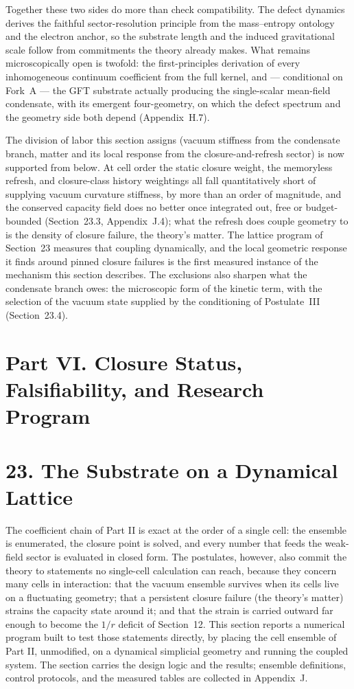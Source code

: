 \documentclass[11pt]{article}
\begin{document}
Together these two sides do more than check compatibility. The defect dynamics derives the faithful sector-resolution principle from the mass--entropy ontology and the electron anchor, so the substrate length and the induced gravitational scale follow from commitments the theory already makes. What remains microscopically open is twofold: the first-principles derivation of every inhomogeneous continuum coefficient from the full kernel, and --- conditional on Fork~A --- the GFT substrate actually producing the single-scalar mean-field condensate, with its emergent four-geometry, on which the defect spectrum and the geometry side both depend (Appendix~H.7).

The division of labor this section assigns (vacuum stiffness from the condensate branch, matter and its local response from the closure-and-refresh sector) is now supported from below. At cell order the static closure weight, the memoryless refresh, and closure-class history weightings all fall quantitatively short of supplying vacuum curvature stiffness, by more than an order of magnitude, and the conserved capacity field does no better once integrated out, free or budget-bounded (Section~23.3, Appendix~J.4); what the refresh does couple geometry to is the density of closure failure, the theory's matter. The lattice program of Section~23 measures that coupling dynamically, and the local geometric response it finds around pinned closure failures is the first measured instance of the mechanism this section describes. The exclusions also sharpen what the condensate branch owes: the microscopic form of the kinetic term, with the selection of the vacuum state supplied by the conditioning of Postulate~III (Section~23.4).
\section*{Part VI. Closure Status, Falsifiability, and Research Program}

\section{23. The Substrate on a Dynamical Lattice}

The coefficient chain of Part II is exact at the order of a single cell: the ensemble is enumerated, the closure point is solved, and every number that feeds the weak-field sector is evaluated in closed form. The postulates, however, also commit the theory to statements no single-cell calculation can reach, because they concern many cells in interaction: that the vacuum ensemble survives when its cells live on a fluctuating geometry; that a persistent closure failure (the theory's matter) strains the capacity state around it; and that the strain is carried outward far enough to become the $1/r$ deficit of Section~12. This section reports a numerical program built to test those statements directly, by placing the cell ensemble of Part II, unmodified, on a dynamical simplicial geometry and running the coupled system. The section carries the design logic and the results; ensemble definitions, control protocols, and the measured tables are collected in Appendix~J.
\end{document}
